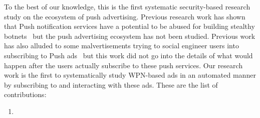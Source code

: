 To the best of our knowledge, this is the first systematic security-based research study on the ecosystem of push advertising. Previous research work has shown that Push notification services have a potential to be abused for building stealthy botnets~\cite{master_web_puppets} but the push advertising ecosystem has not been studied.  Previous work has also alluded to some malvertisements trying to social engineer users into subscribing to Push ads~\cite{imc19_paper} but this work did not go into the details of what would happen after the users actually subscribe to these push services. Our research work is the first to systematically study WPN-based ads in an automated manner by subscribing to and interacting with these ads. These are the list of contributions:
\begin{enumerate}
    \item
\end{enumerate}